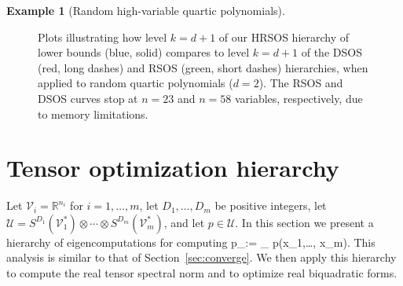 \documentclass[11pt]{article}
\numberwithin{theorem}{section}
\theoremstyle{definition}
\newtheorem{example}[theorem]{Example}
\newcommand{\tinyspace}{\mspace{1mu}}
\newcommand{\ip}[2]{\langle #1 , #2\rangle}
\newcommand{\norm}[1]{\lVert\tinyspace #1 \tinyspace\rVert}
\newcommand{\real}{\mathbb{R}}
\newcommand\V{\mathcal{V}}
\newcommand\U{\mathcal{U}}
\newcommand\Sp{\mathcal{S}}
\newcommand{\ootimes}{ \otimes \cdots \otimes }
\def\ba#1\ea{\begin{align}#1\end{align}}
\begin{document}
\begin{example}[Random high-variable quartic polynomials]
\begin{figure}[!htb]
    	\caption{Plots illustrating how level $k=d+1$ of our HRSOS hierarchy of lower bounds (blue, solid) compares to level $k=d+1$ of the DSOS (red, long dashes) and RSOS (green, short dashes) hierarchies, when applied to random quartic polynomials ($d=2$). The RSOS and DSOS curves stop at $n = 23$ and $n = 58$ variables, respectively, due to memory limitations.}\label{fig:dsos_compare}
    \end{figure}
\end{example}


\section{Tensor optimization hierarchy}\label{sec:tensor}


Let $\V_i=\real^{n_i}$ for $i=1,\dots, m$, let $D_1,\dots, D_m$ be positive integers, let $\U=S^{D_1}(\V_1^*)\ootimes S^{D_m}(\V_m^*)$, and let $p \in \U$. In this section we present a hierarchy of eigencomputations for computing
\ba\label{eq:pminbd}
p_{\min}:= \min_{\substack{x_j \in \V_j\\ \norm{x_j}=1}} p(x_1,\dots, x_m).
\ea
This analysis is similar to that of Section~\ref{sec:converge}. We then apply this hierarchy to compute the real tensor spectral norm and to optimize real biquadratic forms.
\end{document}
